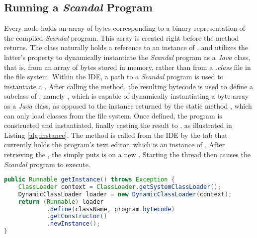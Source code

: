 \subsection{Running a \emph{Scandal} Program}

Every  node holds an array of bytes corresponding to a binary representation of the compiled \emph{Scandal} program. This array is created right before the  method returns. The  class naturally holds a reference to an instance of , and utilizes the latter's  property to dynamically instantiate the \emph{Scandal} program as a \emph{Java} class, that is, from an array of bytes stored in memory, rather than from a \emph{.class} file in the file system. Within the IDE, a path to a \emph{Scandal} program is used to instantiate a . After calling the  method, the resulting bytecode is used to define a subclass of , namely , which is capable of dynamically instantiating a byte array as a \emph{Java} class, as opposed to the instance returned by the static method , which can only load classes from the file system. Once defined, the program is constructed and instantiated, finally casting the result to , as illustrated in Listing \ref{alg:instance}. The  method is called from the IDE by the tab that currently holds the program's text editor, which is an instance of . After retrieving the , the  simply puts is on a new . Starting the thread then causes the \emph{Scandal} program to execute.

\begin{lstlisting}[language=Java,caption={Obtaining an instance of a \emph{Scandal} program.},label={alg:instance}]
public Runnable getInstance() throws Exception {
	ClassLoader context = ClassLoader.getSystemClassLoader();
	DynamicClassLoader loader = new DynamicClassLoader(context);
	return (Runnable) loader
			.define(className, program.bytecode)
			.getConstructor()
			.newInstance();
}
\end{lstlisting}
